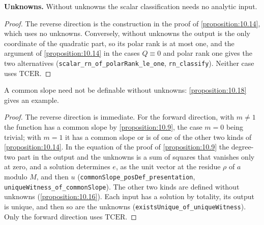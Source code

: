 \textbf{Unknowns.} Without unknowns the scalar classification needs no analytic input.


\begin{proof}
The reverse direction is the construction in the proof of \cref{proposition:10.14}, which uses no unknowns. Conversely, without unknowns the output is the only coordinate of the quadratic part, so its polar rank is at most one, and the argument of \cref{proposition:10.14} in the cases $Q ≡ 0$ and polar rank one gives the two alternatives (\texttt{scalar\_rn\_of\_polarRank\_le\_one}, \texttt{rn\_classify}). Neither case uses $\mathrm{TCER}$.
\end{proof}

A common slope need not be definable without unknowns: \cref{proposition:10.18} gives an example.


\begin{proof}
The reverse direction is immediate. For the forward direction, with $m ≠ 1$ the function has a common slope by \cref{proposition:10.9}, the case $m = 0$ being trivial; with $m = 1$ it has a common slope or is of one of the other two kinds of \cref{proposition:10.14}. In the equation of the proof of \cref{proposition:10.9} the degree-two part in the output and the unknowns is a sum of squares that vanishes only at zero, and a solution determines $e$, as the unit vector at the residue $ρ$ of $a$ modulo $M$, and then $u$ (\texttt{commonSlope\_posDef\_presentation}, \texttt{uniqueWitness\_of\_commonSlope}). The other two kinds are defined without unknowns (\cref{proposition:10.16}). Each input has a solution by totality, its output is unique, and then so are the unknowns (\texttt{existsUnique\_of\_uniqueWitness}). Only the forward direction uses $\mathrm{TCER}$.
\end{proof}

